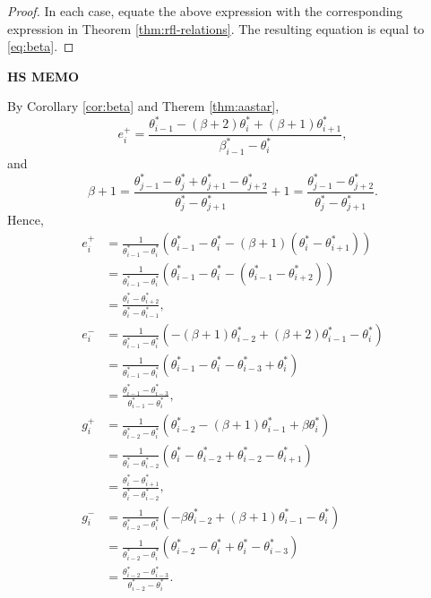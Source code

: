 \documentclass[
]{book}
\theoremstyle{definition}
\theoremstyle{definition}
\theoremstyle{definition}
\theoremstyle{definition}
\theoremstyle{remark}
\begin{document}
\begin{proof}
In each case, equate the above expression with the corresponding expression in Theorem \ref{thm:rfl-relations}.
The resulting equation is equal to \eqref{eq:beta}.
\end{proof}

\textbf{HS MEMO}

By Corollary \ref{cor:beta} and Therem \ref{thm:aastar},
\[e^+_i = \frac{\theta^*_{i-1}-(\beta+2)\theta^*_i + (\beta+1)\theta^*_{i+1}}{\beta^*_{i-1}-\theta^*_i},\]
and
\[\beta + 1 = \frac{\theta^*_{j-1}-\theta^*_j+\theta^*_{j+1}-\theta^*_{j+2}}{\theta^*_j-\theta^*_{j+1}}+1 = \frac{\theta^*_{j-1}-\theta^*_{j+2}}{\theta^*_j-\theta^*_{j+1}}.\]
Hence,
\begin{align}
e^+_i & = \frac{1}{\theta^*_{i-1}-\theta^*_i}(\theta^*_{i-1}-\theta^*_i-(\beta+1)(\theta^*_i-\theta^*_{i+1}))\\
& = \frac{1}{\theta^*_{i-1}-\theta^*_i}(\theta^*_{i-1}-\theta^*_i - (\theta^*_{i-1}-\theta^*_{i+2}))\\
& = \frac{\theta^*_i-\theta^*_{i+2}}{\theta^*_{i}-\theta^*_{i-1}},\\
e^-_i & = \frac{1}{\theta^*_{i-1}-\theta^*_i}(-(\beta+1)\theta^*_{i-2}+(\beta+2)\theta^*_{i-1}-\theta^*_i)\\
& = \frac{1}{\theta^*_{i-1}-\theta^*_i}(\theta^*_{i-1}-\theta^*_i - \theta^*_{i-3}+\theta^*_{i})\\
& = \frac{\theta^*_{i-1}-\theta^*_{i-3}}{\theta^*_{i-1}-\theta^*_{i}},\\
g^+_i & = \frac{1}{\theta^*_{i-2}-\theta^*_i}(\theta^*_{i-2}-(\beta+1)\theta^*_{i-1}+\beta\theta^*_{i})\\
& = \frac{1}{\theta^*_{i}-\theta^*_{i-2}}(\theta^*_{i}-\theta^*_{i-2} + \theta^*_{i-2}-\theta^*_{i+1})\\
& = \frac{\theta^*_i-\theta^*_{i+1}}{\theta^*_{i}-\theta^*_{i-2}},\\
g^-_i & = \frac{1}{\theta^*_{i-2}-\theta^*_i}(-\beta\theta^*_{i-2}+(\beta+1)\theta^*_{i-1}-\theta^*_i)\\
& = \frac{1}{\theta^*_{i-2}-\theta^*_i}(\theta^*_{i-2}-\theta^*_i + \theta^*_{i}-\theta^*_{i-3})\\
& = \frac{\theta^*_{i-2}-\theta^*_{i-3}}{\theta^*_{i-2}-\theta^*_{i}}.
\end{align}
\end{document}
